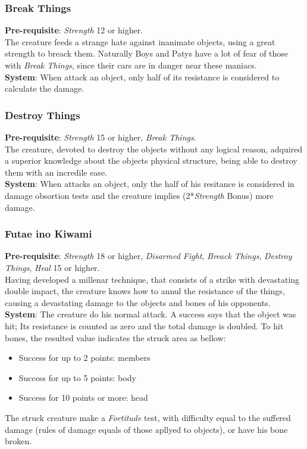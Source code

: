 \documentclass[ letterpaper,12pt]{article}
\begin{document}
\subsubsection{Break Things}
{\bf Pre-requisite}: {\it Strength} 12 or higher.\\
The creature feeds a strange hate against inanimate objects, using a great strength to breack them. Naturally Boys and Patys have a lot of fear of those with {\it Break Things}, since their cars are in danger near these maniacs.\\
{\bf System}: When attack an object, only half of its resistance is considered to calculate the damage.

\subsubsection{Destroy Things}
{\bf Pre-requisite}: {\it Strength} 15 or higher, {\it Break Things}.\\
The creature, devoted to destroy the objects without any logical reason, adquired a superior knowledge about the objects physical structure, being able to destroy them with an incredile ease.\\
{\bf System}: When attacks an object, only the half of his resitance is considered in damage obsortion tests and the creature implies (2*{\it Strength} Bonus) more damage.\\

\subsubsection{Futae ino Kiwami}
{\bf Pre-requisite}: {\it Strength} 18 or higher, {\it Disarmed Fight}, {\it Breack Things}, {\it Destroy Things}, {\it Heal} 15 or higher.\\
Having developed a millenar technique, that consists of a strike with devastating double impact, the creature knows how to annul the resistance of the things, causing a devastating damage to the objects and bones of his opponents.\\
{\bf System}: The creature do his normal attack. A success says that the object was hit; Its resistance is counted as zero and the total damage is doubled. To hit bones, the resulted value indicates the struck area as bellow:\\
\begin{itemize}
\item{Success for up to 2 points: members}
\item{Success for up to 5 points: body}
\item{Success for 10 points or more: head}
\end{itemize}
The struck creature make a {\it Fortitude} test, with difficulty equal to the suffered damage (rules of damage equals of those apllyed to objects), or have his bone broken.
\end{document}
